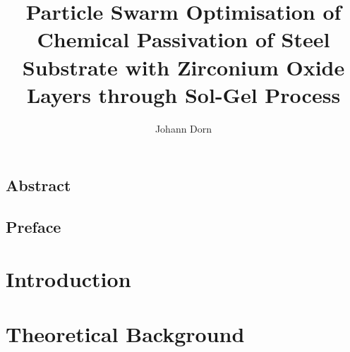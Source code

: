 \documentclass[a4paper,titlepage]{scrreprt}
\title{Particle Swarm Optimisation of Chemical Passivation of Steel Substrate with Zirconium Oxide Layers through Sol-Gel Process}
\author{Johann Dorn}
\begin{document}
\maketitle


\section*{Abstract}


\section*{Preface}
%

\tableofcontents
\clearpage
\printglossaries
\clearpage

\chapter{Introduction}                                
\label{sec:intro}


%

\chapter{Theoretical Background}
\label{sec:theoretical}
%
%
%

\end{document}
